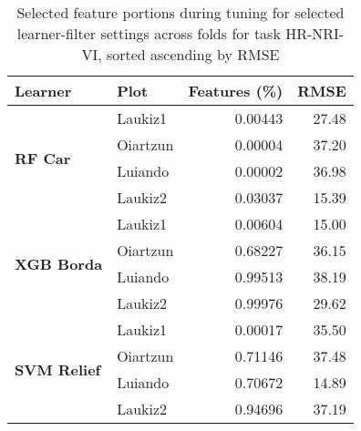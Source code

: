 \begin{table}[ht!]
\centering
\caption{Selected feature portions during tuning for selected learner-filter settings across folds for task HR-NRI-VI, sorted ascending by RMSE} 
\label{tab:tune-perc-sel-features}
\begin{tabular}{llrr}
  \toprule
Learner & Plot & Features (\%) & RMSE \\ 
  \midrule
\midrule\multirow{4}{*}{\textbf{RF Car}} & Laukiz1 & 0.00443 & 27.48 \\ 
   & Oiartzun & 0.00004 & 37.20 \\ 
   & Luiando & 0.00002 & 36.98 \\ 
   & Laukiz2 & 0.03037 & 15.39 \\ 
  \midrule\multirow{4}{*}{\textbf{XGB Borda}} & Laukiz1 & 0.00604 & 15.00 \\ 
   & Oiartzun & 0.68227 & 36.15 \\ 
   & Luiando & 0.99513 & 38.19 \\ 
   & Laukiz2 & 0.99976 & 29.62 \\ 
  \midrule\multirow{4}{*}{\textbf{SVM Relief}} & Laukiz1 & 0.00017 & 35.50 \\ 
   & Oiartzun & 0.71146 & 37.48 \\ 
   & Luiando & 0.70672 & 14.89 \\ 
   & Laukiz2 & 0.94696 & 37.19 \\ 
   \bottomrule
\end{tabular}
\end{table}
